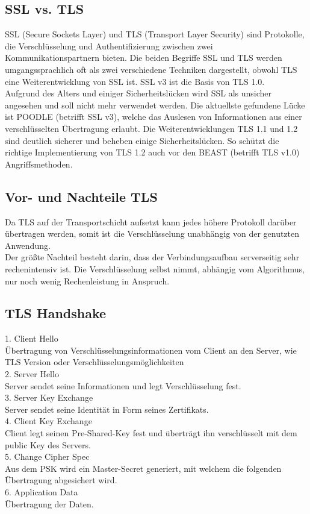 

\subsection{SSL vs. TLS}
SSL (Secure Sockets Layer) und TLS (Transport Layer Security) sind Protokolle, die Verschlüsselung und Authentifizierung zwischen zwei Kommunikationspartnern bieten. Die beiden Begriffe SSL und TLS werden umgangssprachlich oft als zwei verschiedene Techniken dargestellt, obwohl TLS eine Weiterentwicklung von SSL ist. SSL v3 ist die Basis von TLS 1.0. \\
Aufgrund des Alters und einiger Sicherheitslücken wird SSL als unsicher angesehen und soll nicht mehr verwendet werden. Die aktuellste gefundene Lücke ist POODLE\cite{poodle} (betrifft SSL v3), welche das Auslesen von Informationen aus einer verschlüsselten Übertragung erlaubt. Die Weiterentwicklungen TLS 1.1 und 1.2 sind deutlich sicherer und beheben einige Sicherheitslücken. So schützt die richtige Implementierung von TLS 1.2 auch vor den BEAST\cite{beast} (betrifft TLS v1.0) Angriffsmethoden.\\

\subsection{Vor- und Nachteile TLS}
Da TLS auf der Transportschicht aufsetzt kann jedes höhere Protokoll darüber übertragen werden, somit ist die Verschlüsselung unabhängig von der genutzten Anwendung\cite{sslvstls}. \\
	Der größte Nachteil besteht darin, dass der Verbindungsaufbau serverseitig sehr rechenintensiv ist. Die Verschlüsselung selbst nimmt, abhängig vom Algorithmus, nur noch wenig Rechenleistung in Anspruch. \\

\subsection{TLS Handshake}
1. Client Hello\cite{tlspaper}\\
Übertragung von Verschlüsselungsinformationen vom Client an den Server, wie TLS Version oder Verschlüsselungsmöglichkeiten\\
2. Server Hello \\
Server sendet seine Informationen und legt Verschlüsselung fest. \\
3. Server Key Exchange\\
Server sendet seine Identität in Form seines Zertifikats. \\
4. Client Key Exchange\\
Client legt seinen Pre-Shared-Key fest und überträgt ihn verschlüsselt mit dem public Key des Servers.\\
5. Change Cipher Spec\\
Aus dem PSK wird ein Master-Secret generiert, mit welchem die folgenden Übertragung abgesichert wird. \\
6. Application Data\\
Übertragung der Daten. \\

